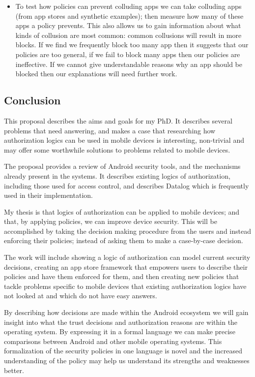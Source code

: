 \documentclass[a4paper,sfsidenotes]{%
  article%
}
\begin{document}
\begin{itemize}
  \item To test how policies can prevent colluding apps we can take colluding
  apps (from app stores and synthetic examples); then measure how many of these
  apps a policy prevents.  This also allows us to gain information about what
  kinds of collusion are most common: common collusions will result in more
  blocks.  If we find we frequently block too many app then it suggests that our
  policies are too general, if we fail to block many apps then our policies are
  ineffective.  If we cannot give understandable reasons why an app should be
  blocked then our explanations will need further work.

\end{itemize}

\subsection{Conclusion}

This proposal describes the aims and goals for my PhD.  It describes several
problems that need answering, and makes a case that researching how
authorization logics can be used in mobile devices is interesting, non-trivial
and may offer some worthwhile solutions to problems related to mobile devices.

The proposal provides a review of Android security tools, and the mechanisms
already present in the systems.  It describes existing logics of authorization,
including those used for access control, and describes Datalog which is
frequently used in their implementation. 

My thesis is that logics of authorization can be applied to mobile devices; and
that, by applying policies, we can improve device security.  This will be
accomplished by taking the decision making procedure from the users and instead
enforcing their policies; instead of asking them to make a case-by-case
decision.

The work will include showing a logic of authorization can model current
security decisions, creating an app store framework that empowers users to
describe their policies and have them enforced for them, and then creating new
policies that tackle problems specific to mobile devices that existing
authorization logics have not looked at and which do not have easy answers.


By describing how decisions are made within the Android ecosystem we will gain
insight into what the trust decisions and authorization reasons are within the
operating system.  By expressing it in a formal language we can make precise
comparisons between Android and other mobile operating systems.  This
formalization of the security policies in one language is novel and the
increased understanding of the policy may help us understand its strengths and
weaknesses better.
\end{document}
